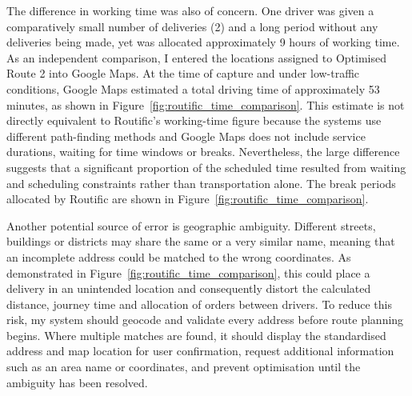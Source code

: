 \documentclass[11pt]{article}
\begin{document}
The difference in working time was also of concern. One driver was given a comparatively small number of deliveries (2) and a long period without any deliveries being made, yet was allocated approximately 9 hours of working time. As an independent comparison, I entered the locations assigned to Optimised Route 2 into Google Maps. At the time of capture and under low-traffic conditions, Google Maps estimated a total driving time of approximately 53 minutes, as shown in Figure~\ref{fig:routific_time_comparison}. This estimate is not directly equivalent to Routific's working-time figure because the systems use different path-finding methods and Google Maps does not include service durations, waiting for time windows or breaks. Nevertheless, the large difference suggests that a significant proportion of the scheduled time resulted from waiting and scheduling constraints rather than transportation alone. The break periods allocated by Routific are shown in Figure~\ref{fig:routific_time_comparison}.

Another potential source of error is geographic ambiguity. Different streets, buildings or districts may share the same or a very similar name, meaning that an incomplete address could be matched to the wrong coordinates. As demonstrated in Figure~\ref{fig:routific_time_comparison}, this could place a delivery in an unintended location and consequently distort the calculated distance, journey time and allocation of orders between drivers. To reduce this risk, my system should geocode and validate every address before route planning begins. Where multiple matches are found, it should display the standardised address and map location for user confirmation, request additional information such as an area name or coordinates, and prevent optimisation until the ambiguity has been resolved.
\end{document}
